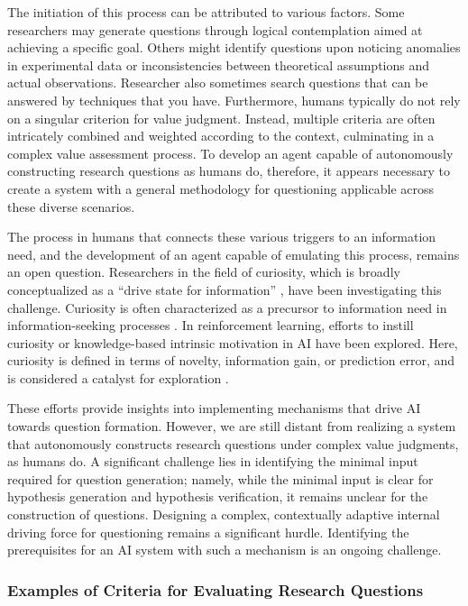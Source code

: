 \documentclass{article}
\begin{document}
The initiation of this process can be attributed to various factors. Some researchers may generate questions through logical contemplation aimed at achieving a specific goal. Others might identify questions upon noticing anomalies in experimental data or inconsistencies between theoretical assumptions and actual observations. Researcher also sometimes search questions that can be answered by techniques that you have. Furthermore, humans typically do not rely on a singular criterion for value judgment. Instead, multiple criteria are often intricately combined and weighted according to the context, culminating in a complex value assessment process. To develop an agent capable of autonomously constructing research questions as humans do, therefore, it appears necessary to create a system with a general methodology for questioning applicable across these diverse scenarios.

The process in humans that connects these various triggers to an information need, and the development of an agent capable of emulating this process, remains an open question. Researchers in the field of curiosity, which is broadly conceptualized as a ``drive state for information'' \cite{kidd2015psychology}, have been investigating this challenge. Curiosity is often characterized as a precursor to information need in information-seeking processes \cite{case2016looking}. In reinforcement learning, efforts to instill curiosity or knowledge-based intrinsic motivation in AI have been explored. Here, curiosity is defined in terms of novelty, information gain, or prediction error, and is considered a catalyst for exploration \cite{aubret2019survey}.

These efforts provide insights into implementing mechanisms that drive AI towards question formation. However, we are still distant from realizing a system that autonomously constructs research questions under complex value judgments, as humans do. A significant challenge lies in identifying the minimal input required for question generation; namely, while the minimal input is clear for hypothesis generation and hypothesis verification, it remains unclear for the construction of questions. Designing a complex, contextually adaptive internal driving force for questioning remains a significant hurdle. Identifying the prerequisites for an AI system with such a mechanism is an ongoing challenge.

\subsubsection{Examples of Criteria for Evaluating Research Questions}
\end{document}
